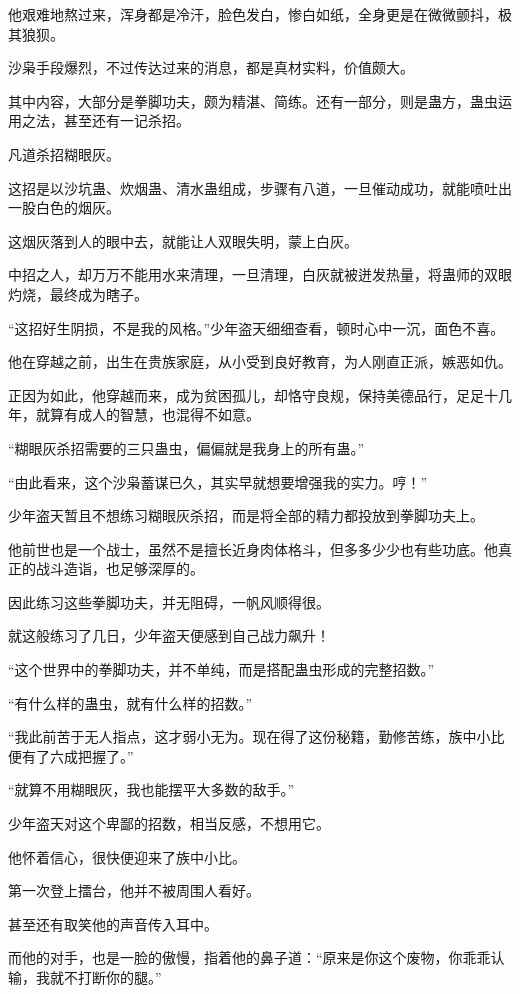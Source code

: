 \begin{this_body}
他艰难地熬过来，浑身都是冷汗，脸色发白，惨白如纸，全身更是在微微颤抖，极其狼狈。

沙枭手段爆烈，不过传达过来的消息，都是真材实料，价值颇大。

其中内容，大部分是拳脚功夫，颇为精湛、简练。还有一部分，则是蛊方，蛊虫运用之法，甚至还有一记杀招。

凡道杀招糊眼灰。

这招是以沙坑蛊、炊烟蛊、清水蛊组成，步骤有八道，一旦催动成功，就能喷吐出一股白色的烟灰。

这烟灰落到人的眼中去，就能让人双眼失明，蒙上白灰。

中招之人，却万万不能用水来清理，一旦清理，白灰就被迸发热量，将蛊师的双眼灼烧，最终成为瞎子。

“这招好生阴损，不是我的风格。”少年盗天细细查看，顿时心中一沉，面色不喜。

他在穿越之前，出生在贵族家庭，从小受到良好教育，为人刚直正派，嫉恶如仇。

正因为如此，他穿越而来，成为贫困孤儿，却恪守良规，保持美德品行，足足十几年，就算有成人的智慧，也混得不如意。

“糊眼灰杀招需要的三只蛊虫，偏偏就是我身上的所有蛊。”

“由此看来，这个沙枭蓄谋已久，其实早就想要增强我的实力。哼！”

少年盗天暂且不想练习糊眼灰杀招，而是将全部的精力都投放到拳脚功夫上。

他前世也是一个战士，虽然不是擅长近身肉体格斗，但多多少少也有些功底。他真正的战斗造诣，也足够深厚的。

因此练习这些拳脚功夫，并无阻碍，一帆风顺得很。

就这般练习了几日，少年盗天便感到自己战力飙升！

“这个世界中的拳脚功夫，并不单纯，而是搭配蛊虫形成的完整招数。”

“有什么样的蛊虫，就有什么样的招数。”

“我此前苦于无人指点，这才弱小无为。现在得了这份秘籍，勤修苦练，族中小比便有了六成把握了。”

“就算不用糊眼灰，我也能摆平大多数的敌手。”

少年盗天对这个卑鄙的招数，相当反感，不想用它。

他怀着信心，很快便迎来了族中小比。

第一次登上擂台，他并不被周围人看好。

甚至还有取笑他的声音传入耳中。

而他的对手，也是一脸的傲慢，指着他的鼻子道：“原来是你这个废物，你乖乖认输，我就不打断你的腿。”


\end{this_body}
